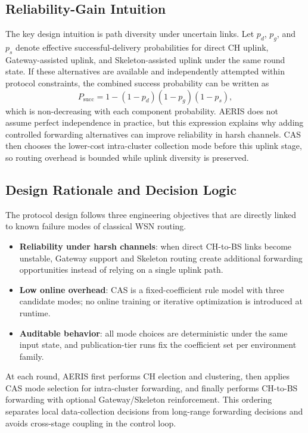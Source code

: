 ﻿\documentclass[sensors,article,submit,moreauthors,pdftex]{Definitions/mdpi}
\begin{document}
\subsection{Reliability-Gain Intuition}
The key design intuition is path diversity under uncertain links. Let \(p_d\), \(p_g\), and \(p_s\) denote effective successful-delivery probabilities for direct CH uplink, Gateway-assisted uplink, and Skeleton-assisted uplink under the same round state. If these alternatives are available and independently attempted within protocol constraints, the combined success probability can be written as
\begin{equation}
P_{\mathrm{succ}} = 1 - (1-p_d)(1-p_g)(1-p_s),
\end{equation}
which is non-decreasing with each component probability. AERIS does not assume perfect independence in practice, but this expression explains why adding controlled forwarding alternatives can improve reliability in harsh channels. CAS then chooses the lower-cost intra-cluster collection mode before this uplink stage, so routing overhead is bounded while uplink diversity is preserved.

\subsection{Design Rationale and Decision Logic}
The protocol design follows three engineering objectives that are directly linked to known failure modes of classical WSN routing.
\begin{itemize}
\item \textbf{Reliability under harsh channels}: when direct CH-to-BS links become unstable, Gateway support and Skeleton routing create additional forwarding opportunities instead of relying on a single uplink path.
\item \textbf{Low online overhead}: CAS is a fixed-coefficient rule model with three candidate modes; no online training or iterative optimization is introduced at runtime.
\item \textbf{Auditable behavior}: all mode choices are deterministic under the same input state, and publication-tier runs fix the coefficient set per environment family.
\end{itemize}

At each round, AERIS first performs CH election and clustering, then applies CAS mode selection for intra-cluster forwarding, and finally performs CH-to-BS forwarding with optional Gateway/Skeleton reinforcement. This ordering separates local data-collection decisions from long-range forwarding decisions and avoids cross-stage coupling in the control loop.
\end{document}
